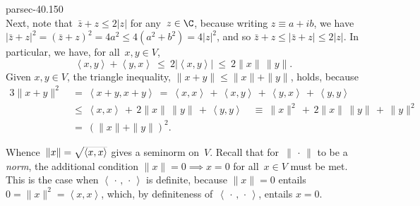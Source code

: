 \documentclass[b5page]{book}
\begin{document}
\begin{solution}{parsec-40.150}
\begin{equation*}
    \end{equation*}
Next, note that~$\bar{z}+z \leq 2\left|z\right|$ for any~$z\in\C$,
    because writing $z\equiv a+ib$,
    we have $\left|\bar{z}+z\right|^2=(\bar{z}+z)^2 = 4a^2 \leq 4(a^2 + b^2) = 4\left|z\right|^2$,
    and so $\bar{z}+z \leq \left|\bar{z}+z\right|\leq 2\left|z\right|$.
In particular, we have,
for all~$x,y\in V$,
\begin{equation*}
\left<x,y\right>+\left<y,x\right>
\ \leq\  2\left|\left<x,y\right>\right|\ \leq\ 
2 \|x\|\,\|y\|.
\end{equation*}
Given $x,y\in V$,
the triangle inequality,
$\|x+y\|\leq \|x\|+\|y\|$,
holds,
because
\begin{alignat*}{3}
    \|x+y\|^2\ &=\ 
    \left<x+y,x+y\right> 
    \ =\ \left<x,x\right>\,+\,
    \left<x,y\right>\,+\,
    \left<y,x\right>\,+\,
    \left<y,y\right> \\
    &\leq \ \left<x,x\right>\,+\,
    2\|x\|\,\|y\|
    \,+\,
    \left<y,y\right>  
    \quad\equiv\ 
    \|x\|^2 \,+\, 2\|x\|\,\|y\| \,+\, \|y\|^2\\
    \ &=\   (\|x\|+\|y\|)^2.
\end{alignat*}

Whence~$\|x\|=\smash{\sqrt{\left<x,x\right>}}$ gives
a seminorm on~$V$.
Recall that for~$\|\,\cdot\,\|$ to be a \emph{norm},
the additional condition
$\|x\|=0\implies x=0$
for all~$x\in V$
must be met.
This is the case when
$\left<\,\cdot\,,\,\cdot\,\right>$
is definite,
because 
$\|x\|=0$
entails $0=\|x\|^2=\left<x,x\right>$,
which, by definiteness of~$\left<\,\cdot\,,\,\cdot\,\right>$,
entails $x=0$.


\end{solution}
\end{document}
